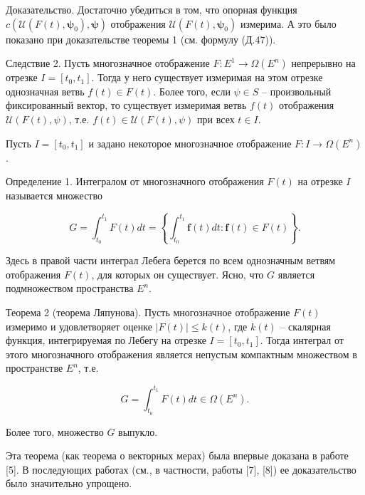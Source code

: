 \documentclass[8pt]{extarticle}
\begin{document}
Доказательство. Достаточно убедиться в том, что опорная функция \(c\left( {\mathcal{U}\left( {F\left( t\right),{\mathbf{\psi }}_{0}}\right),\mathbf{\psi }}\right)\) отображения \(\mathcal{U}\left( {F\left( t\right),{\mathbf{\psi }}_{0}}\right)\) измерима. А это было показано при доказательстве теоремы 1 (см. формулу (Д.47)).

Следствие 2. Пусть многозначное отображение \(F : {E}^{1} \rightarrow \Omega \left( {E}^{n}\right)\) непрерывно на отрезке \(I = \left\lbrack {{t}_{0},{t}_{1}}\right\rbrack\). Тогда у него существует измеримая на этом отрезке однозначная ветвь \(f\left( t\right) \in F\left( t\right)\). Более того, если \(\psi \in S\) -- произвольный фиксированный вектор, то существует измеримая ветвь \(f\left( t\right)\) отображения \(\mathcal{U}\left( {F\left( t\right),\psi}\right)\), т.е. \(f\left( t\right) \in \mathcal{U}\left( {F\left( t\right),\psi}\right)\) при всех \(t \in I\).

Пусть \(I = \left\lbrack {{t}_{0},{t}_{1}}\right\rbrack\) и задано некоторое многозначное отображение \(F : I \rightarrow \Omega \left( {E}^{n}\right)\).

Определение 1. Интегралом от многозначного отображения \(F\left( t\right)\) на отрезке \(I\) называется множество

\[
G = {\int }_{{t}_{0}}^{{t}_{1}}F\left( t\right) {dt} =
\left\{ {{\int }_{{t}_{0}}^{{t}_{1}}\mathbf{f}\left( t\right) {dt} : \mathbf{f}\left( t\right) \in F\left( t\right)}\right\}.
\]

Здесь в правой части интеграл Лебега берется по всем однозначным ветвям отображения \(F\left( t\right)\), для которых он существует. Ясно, что \(G\) является подмножеством пространства \({E}^{n}\).

Теорема 2 (теорема Ляпунова). Пусть многозначное отображение \(F\left( t\right)\) измеримо и удовлетворяет оценке \(\left| {F\left( t\right)}\right| \leq k\left( t\right)\), где \(k\left( t\right)\) -- скалярная функция, интегрируемая по Лебегу на отрезке \(I = \left\lbrack {{t}_{0},{t}_{1}}\right\rbrack\). Тогда интеграл от этого многозначного отображения является непустым компактным множеством в пространстве \({E}^{n}\), т.е.

\[
G = {\int }_{{t}_{0}}^{{t}_{1}}F\left( t\right) {dt} \in \Omega \left( {E}^{n}\right).
\]

Более того, множество \(G\) выпукло.

Эта теорема (как теорема о векторных мерах) была впервые доказана в работе [5]. В последующих работах (см., в частности, работы [7], [8]) ее доказательство было значительно упрощено.
\end{document}
